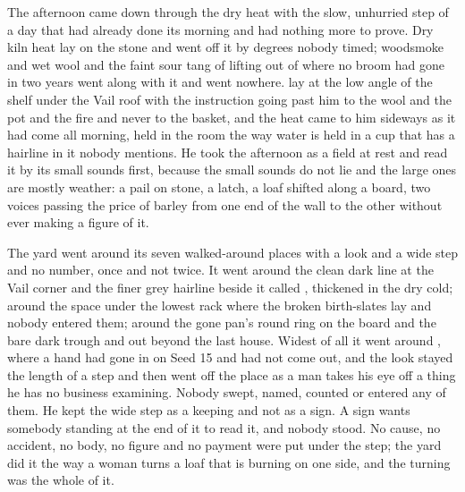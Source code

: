 The afternoon came down through the dry heat with the slow, unhurried step of a day that had already done its morning and had nothing more to prove. Dry kiln heat lay on the stone and went off it by degrees nobody timed; woodsmoke and wet wool and the faint sour tang of  lifting out of  where no broom had gone in two years went along with it and went nowhere.  lay at the low angle of the shelf under the Vail roof with the instruction going past him to the wool and the pot and the fire and never to the basket, and the heat came to him sideways as it had come all morning, held in the room the way water is held in a cup that has a hairline in it nobody mentions. He took the afternoon as a field at rest and read it by its small sounds first, because the small sounds do not lie and the large ones are mostly weather: a pail on stone, a latch, a loaf shifted along a board, two voices passing the price of barley from one end of the wall to the other without ever making a figure of it.

The yard went around its seven walked-around places with a look and a wide step and no number, once and not twice. It went around the clean dark line at the Vail corner and the finer grey hairline beside it called , thickened in the dry cold; around the space under the lowest rack where the broken birth-slates lay and nobody entered them; around the gone pan's round ring on the board and the bare dark trough and  out beyond the last house. Widest of all it went around , where a hand had gone in on Seed 15 and had not come out, and the look stayed the length of a step and then went off the place as a man takes his eye off a thing he has no business examining. Nobody swept, named, counted or entered any of them. He kept the wide step as a keeping and not as a sign. A sign wants somebody standing at the end of it to read it, and nobody stood. No cause, no accident, no body, no figure and no payment were put under the step; the yard did it the way a woman turns a loaf that is burning on one side, and the turning was the whole of it.

